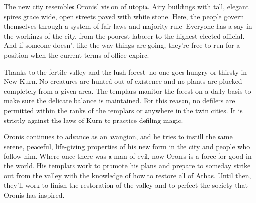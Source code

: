 {	The new city resembles Oronis' vision of utopia. Airy buildings with tall, elegant spires grace wide, open streets paved with white stone. Here, the people govern themselves through a system of fair laws and majority rule. Everyone has a say in the workings of the city, from the poorest laborer to the highest elected official. And if someone doesn't like the way things are going, they're free to run for a position when the current terms of office expire.

	Thanks to the fertile valley and the lush forest, no one goes hungry or thirsty in New Kurn. No creatures are hunted out of existence and no plants are plucked completely from a given area. The templars monitor the forest on a daily basis to make sure the delicate balance is maintained. For this reason, no defilers are permitted within the ranks of the templars or anywhere in the twin cities. It is strictly against the laws of Kurn to practice defiling magic.

	Oronis continues to advance as an avangion, and he tries to instill the same serene, peaceful, life-giving properties of his new form in the city and people who follow him. Where once there was a man of evil, now Oronis is a force for good in the world. His templars work to promote his plans and prepare to someday strike out from the valley with the knowledge of how to restore all of Athas. Until then, they'll work to finish the restoration of the valley and to perfect the society that Oronis has inspired.
}
